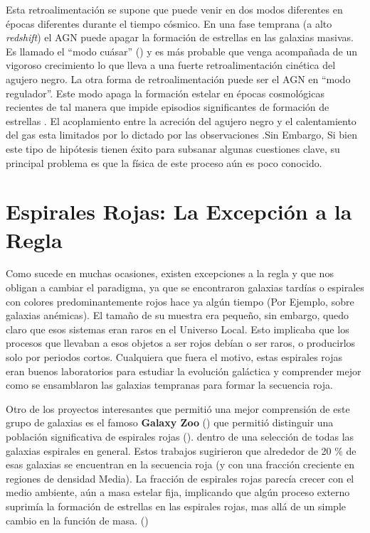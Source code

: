 \bigskip

\noindent Esta retroalimentación se supone que puede venir en dos modos diferentes en épocas diferentes
durante el tiempo cósmico. En una fase temprana (a alto \textsl{redshift}) el
AGN puede apagar la formación de estrellas en las galaxias masivas. Es llamado el ``modo cuásar''
(\citet{croton2006}) y es más probable que venga acompañada de  un vigoroso
crecimiento lo que lleva a una fuerte retroalimentación cinética del agujero negro.
La otra forma de retroalimentación puede ser el AGN en ``modo regulador''. Este modo apaga la formación estelar en  épocas cosmológicas  recientes de tal manera que impide episodios significantes  de formación de estrellas \citep{fabian2006}. El acoplamiento entre la
acreción del agujero negro y el calentamiento  del gas esta limitados por lo dictado por las
observaciones .Sin Embargo, Si bien este tipo de hipótesis tienen éxito para subsanar algunas cuestiones clave, su principal problema es que la física de este proceso aún es poco conocido.

\section{Espirales Rojas: La Excepción a la Regla}

Como sucede en muchas ocasiones, existen excepciones a la regla y que nos obligan a cambiar el paradigma,
ya que se encontraron galaxias tardías o espirales con colores predominantemente rojos hace ya algún tiempo
(Por Ejemplo, \cite{bergh1976} sobre galaxias anémicas). El tamaño de su muestra era pequeño, sin embargo, quedo claro
que esos sistemas eran raros en el Universo Local. Esto implicaba que los procesos que llevaban a esos
objetos a ser rojos debían o ser raros, o producirlos solo por periodos cortos.
Cualquiera que fuera el motivo, estas espirales rojas eran  buenos laboratorios para estudiar
la evolución galáctica y comprender mejor como se ensamblaron las galaxias tempranas para formar la secuencia roja.

\bigskip

\noindent Otro de los proyectos interesantes que permitió una mejor comprensión de este grupo de galaxias es el famoso
\textbf{Galaxy Zoo}  (\cite{lintott2008})  que permitió distinguir una población significativa de espirales rojas (\cite{bamford2008}).
dentro de una selección de todas las galaxias espirales en general. Estos trabajos sugirieron que alrededor de 20 \% de esas galaxias se encuentran en la secuencia roja (y con una fracción creciente en regiones de densidad Media).
La fracción de espirales rojas parecía crecer con el medio ambiente, aún a masa estelar fija, implicando que algún proceso externo suprimía la formación de estrellas en las espirales rojas, mas allá de un simple cambio en la función de masa. (\cite{bamford2008})

